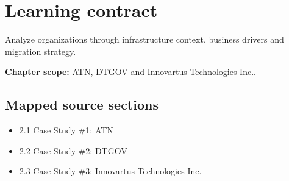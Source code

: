\documentclass[10pt,letterpaper]{article}
\begin{document}
\sourceStatement
\tableofcontents
\newpage
\section{Learning contract}
\begin{takeaway}
Analyze organizations through infrastructure context, business drivers and migration strategy.
\end{takeaway}
\textbf{Chapter scope:} ATN, DTGOV and Innovartus Technologies Inc..\\
\subsection{Mapped source sections}
\begin{itemize}
\item 2.1 Case Study \#1: ATN
\item 2.2 Case Study \#2: DTGOV
\item 2.3 Case Study \#3: Innovartus Technologies Inc.
\end{itemize}
\end{document}
